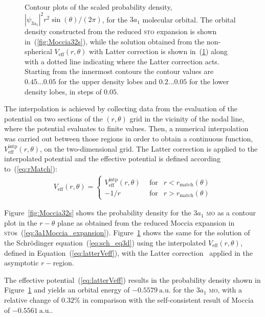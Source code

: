 \begin{figure}
\begin{subfigure}[b]{0.275\linewidth}
    \caption{}\label{fig:intp32s}
  \end{subfigure}
  \caption{Contour plots of the scaled probability density,
    $|\psi_{\mathrm{3a_{1}}}|^{2}r^{2}\sin(\theta)/(2\pi)$, for the
    $3a_{1}$ molecular orbital. The orbital density constructed from
    the reduced \textsc{sto} expansion is shown
    in~(\ref{fig:Moccia32s}), while the solution obtained from the
    non-spherical $V_{\mathrm{eff}}(r,\theta)$ with Latter correction
    is shown in~(\ref{fig:intp32s}) along with a dotted line
    indicating where the Latter correction acts. Starting from the
    innermost contours the contour values are $0.45\dots 0.05$ for the
    upper density lobes and $0.2\dots 0.05$ for the lower density
    lobes, in steps of $0.05$.}
  \label{fig:density_contours}
\end{figure}

The interpolation is achieved by collecting data from the evaluation
of the potential on two sections of the $(r,\theta)$ grid in the
vicinity of the nodal line, where the potential evaluates to finite
values. Then, a numerical interpolation was carried out between those
regions in order to obtain a continuous function,
$V_{\mathrm{eff}}^{\mathrm{intp}}(r,\theta)$, on the two-dimensional
grid. The Latter correction is applied to the interpolated potential
and the effective potential is defined according to~(\ref{eq:rMatch}):
%
\begin{eqnarray}
  V_{\mathrm{eff}}(r,\theta) = \left\{
  \begin{split}
    V_{\mathrm{eff}}^{\mathrm{intp}}(r,\theta)\
    & \mathrm{~for} & r < r_{\mathrm{match}}(\theta) \\
    -1/r\ & \mathrm{~for} &  r > r_{\mathrm{match}}(\theta)
  \end{split}
\right.
\label{eq:latterVeff}
\end{eqnarray}
%

Figure~\ref{fig:Moccia32s} shows the probability density for the
$3a_{1}$ \textsc{mo} as a contour plot in the $r-\theta$ plane as
obtained from the reduced Moccia expansion in
\textsc{sto}s~(\ref{eq:3a1Moccia_expansion}). Figure~\ref{fig:intp32s}
shows the same for the solution of the Schr\"{o}dinger
equation~(\ref{eq:sch_eq3d}) using the interpolated
$V_{\mathrm{eff}}(r,\theta)$, defined in
Equation~(\ref{eq:latterVeff}), with the Latter
correction~\cite{LatterCor_1955} applied in the asymptotic $r-$region.

The effective potential~(\ref{eq:latterVeff}) results in the
probability density shown in Figure~\ref{fig:intp32s} and yields an
orbital energy of $-0.5579\ \mathrm{a.u.}$ for the $3a_{1}$
\textsc{mo}, with a relative change of $0.32\%$ in comparison with the
self-consistent result of Moccia~\cite{Moccia_1964} of
$-0.5561\ \mathrm{a.u.}$.

